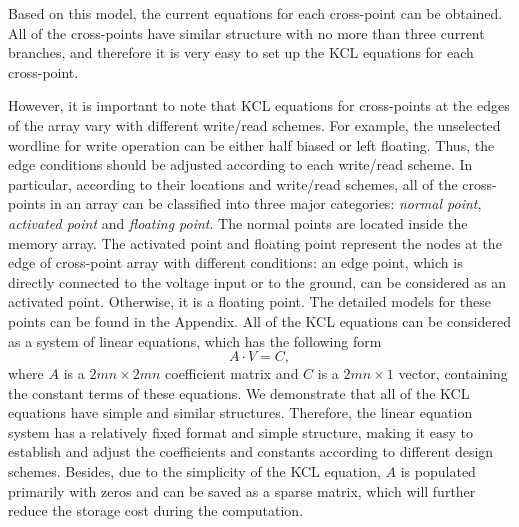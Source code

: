 Based on this model, the current equations for each cross-point can be
obtained. All of the cross-points have similar structure with no more than
three current branches, and therefore it is very easy to set up the KCL
equations for each cross-point.

However, it is important to note that KCL equations for cross-points at
the edges of the array vary with different write/read schemes. For
example, the unselected wordline for write operation can be either half
biased or left floating. Thus, the edge conditions should be adjusted
according to each write/read scheme. In particular, according to their
locations and write/read schemes, all of the cross-points in an array can
be classified into three major categories: \emph{normal point},
\emph{activated point} and \emph{floating point}. The normal points are
located inside the memory array. The activated point and floating point
represent the nodes at the edge of cross-point array with different
conditions: an edge point, which is directly connected to the voltage
input or to the ground, can be considered as an activated point.
Otherwise, it is a floating point. The detailed models for these points
can be found in the Appendix. All of the KCL equations can be considered as a system of linear equations, which has the following form
\begin{equation}\label{equ:matrix}
A\cdot V = C,
\end{equation}
where $A$ is a ${2mn\times{2mn}}$ coefficient matrix and $C$ is a
${2mn\times{1}}$ vector, containing the constant terms of these equations.
We demonstrate that all of the KCL equations have simple and similar
structures. Therefore, the linear equation system has a relatively fixed
format and simple structure, making it easy to establish and adjust the
coefficients and constants according to different design schemes. Besides,
due to the simplicity of the KCL equation, $A$ is populated primarily with
zeros and can be saved as a sparse matrix, which will further reduce the
storage cost during the computation.

